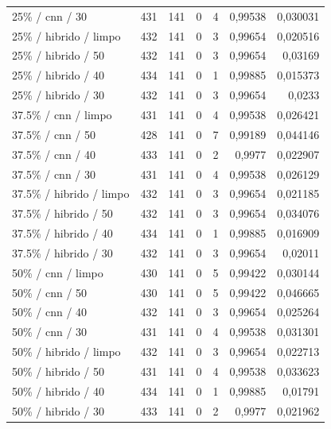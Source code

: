 \begin{longtable}{@{}p{.38\linewidth}rrrrrr@{}}
25\% /\allowbreak{} cnn /\allowbreak{} 30 & 431 & 141 & 0 & 4 & 0,99538 & 0,030031\\
25\% /\allowbreak{} hibrido /\allowbreak{} limpo & 432 & 141 & 0 & 3 & 0,99654 & 0,020516\\
25\% /\allowbreak{} hibrido /\allowbreak{} 50 & 432 & 141 & 0 & 3 & 0,99654 & 0,03169\\
25\% /\allowbreak{} hibrido /\allowbreak{} 40 & 434 & 141 & 0 & 1 & 0,99885 & 0,015373\\
25\% /\allowbreak{} hibrido /\allowbreak{} 30 & 432 & 141 & 0 & 3 & 0,99654 & 0,0233\\
37.5\% /\allowbreak{} cnn /\allowbreak{} limpo & 431 & 141 & 0 & 4 & 0,99538 & 0,026421\\
37.5\% /\allowbreak{} cnn /\allowbreak{} 50 & 428 & 141 & 0 & 7 & 0,99189 & 0,044146\\
37.5\% /\allowbreak{} cnn /\allowbreak{} 40 & 433 & 141 & 0 & 2 & 0,9977 & 0,022907\\
37.5\% /\allowbreak{} cnn /\allowbreak{} 30 & 431 & 141 & 0 & 4 & 0,99538 & 0,026129\\
37.5\% /\allowbreak{} hibrido /\allowbreak{} limpo & 432 & 141 & 0 & 3 & 0,99654 & 0,021185\\
37.5\% /\allowbreak{} hibrido /\allowbreak{} 50 & 432 & 141 & 0 & 3 & 0,99654 & 0,034076\\
37.5\% /\allowbreak{} hibrido /\allowbreak{} 40 & 434 & 141 & 0 & 1 & 0,99885 & 0,016909\\
37.5\% /\allowbreak{} hibrido /\allowbreak{} 30 & 432 & 141 & 0 & 3 & 0,99654 & 0,02011\\
50\% /\allowbreak{} cnn /\allowbreak{} limpo & 430 & 141 & 0 & 5 & 0,99422 & 0,030144\\
50\% /\allowbreak{} cnn /\allowbreak{} 50 & 430 & 141 & 0 & 5 & 0,99422 & 0,046665\\
50\% /\allowbreak{} cnn /\allowbreak{} 40 & 432 & 141 & 0 & 3 & 0,99654 & 0,025264\\
50\% /\allowbreak{} cnn /\allowbreak{} 30 & 431 & 141 & 0 & 4 & 0,99538 & 0,031301\\
50\% /\allowbreak{} hibrido /\allowbreak{} limpo & 432 & 141 & 0 & 3 & 0,99654 & 0,022713\\
50\% /\allowbreak{} hibrido /\allowbreak{} 50 & 431 & 141 & 0 & 4 & 0,99538 & 0,033623\\
50\% /\allowbreak{} hibrido /\allowbreak{} 40 & 434 & 141 & 0 & 1 & 0,99885 & 0,01791\\
50\% /\allowbreak{} hibrido /\allowbreak{} 30 & 433 & 141 & 0 & 2 & 0,9977 & 0,021962\\
\bottomrule\end{longtable}\normalsize

